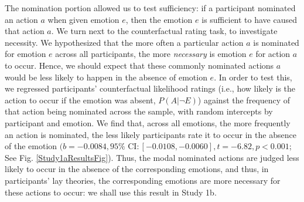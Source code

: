 \documentclass[10pt,letterpaper]{article}
\begin{document}
\begin{table}
\caption{ Action nominations from emotions (Study 1a). Top 5 responses for each emotion, with nomination counts in parentheses. The most common responses for anger were variants of ``hit X", where X is an object or person (of these, the modal response was: ``punched the wall"). }
\label{Study1aResultsTable}
\end{table}


The nomination portion allowed us to test sufficiency: if a participant nominated an action $a$ when given emotion $e$, then the emotion $e$ is sufficient to have caused that action $a$. We turn next to the counterfactual rating task, to investigate necessity. We hypothesized that the more often a particular action $a$ is nominated for emotion $e$ across all participants, the more \textit{necessary} is emotion $e$ for action $a$ to occur. Hence, we should expect that these commonly nominated actions $a$ would be less likely to happen in the absence of emotion $e$. In order to test this, we regressed participants' counterfactual likelihood ratings (i.e., how likely is the action to occur if the emotion was absent, $P(A | \neg E)$) against the frequency of that action being nominated across the sample, with random intercepts by participant and emotion. We find that, across all emotions, the more frequently an action is nominated, the less likely participants rate it to occur in the absence of the emotion $(b = -0.0084, 95\% \text{ CI}: [-0.0108, -0.0060], t=-6.82, p<0.001$; See Fig. \ref{Study1aResultsFig}). Thus, the modal nominated actions are judged less likely to occur in the absence of the corresponding emotions, and thus, in participants' lay theories, the corresponding emotions are more necessary for these actions to occur: we shall use this result in Study 1b.
\end{document}
